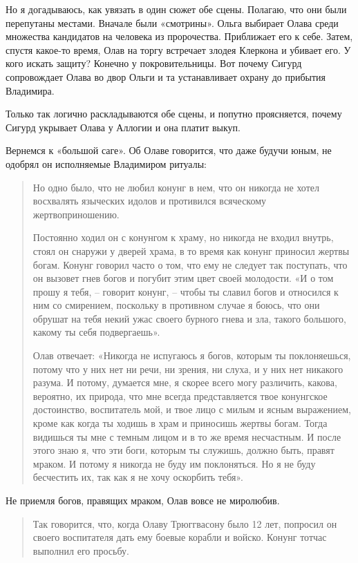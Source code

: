 Но я догадываюсь, как увязать в один сюжет обе сцены. Полагаю, что они были перепутаны местами. Вначале были «смотрины». Ольга выбирает Олава среди множества кандидатов на человека из пророчества. Приближает его к себе. Затем, спустя какое-то время, Олав на торгу встречает злодея Клеркона и убивает его. У кого искать защиту? Конечно у покровительницы. Вот почему Сигурд сопровождает Олава во двор Ольги и та устанавливает охрану до прибытия Владимира.

Только так логично раскладываются обе сцены, и попутно проясняется, почему Сигурд укрывает Олава у Аллогии и она платит выкуп. 

Вернемся к «большой саге». Об Олаве говорится, что даже будучи юным, не одобрял он исполняемые Владимиром ритуалы:

\begin{quotation}
Но одно было, что не любил конунг в нем, что он никогда не хотел восхвалять языческих идолов и противился всяческому жертвоприношению.

Постоянно ходил он с конунгом к храму, но никогда не входил внутрь, стоял он снаружи у дверей храма, в то время как конунг приносил жертвы богам. Конунг говорил часто о том, что ему не следует так поступать, что он вызовет гнев богов и погубит этим цвет своей молодости. «И о том прошу я тебя, – говорит конунг, – чтобы ты славил богов и относился к ним со смирением, поскольку в противном случае я боюсь, что они обрушат на тебя некий ужас своего бурного гнева и зла, такого большого, какому ты себя подвергаешь». 

Олав отвечает: «Никогда не испугаюсь я богов, которым ты поклоняешься, потому что у них нет ни речи, ни зрения, ни слуха, и у них нет никакого разума. И потому, думается мне, я скорее всего могу различить, какова, вероятно, их природа, что мне всегда представляется твое конунгское достоинство, воспитатель мой, и твое лицо с милым и ясным выражением, кроме как когда ты ходишь в храм и приносишь жертвы богам. Тогда видишься ты мне с темным лицом и в то же время несчастным. И после этого знаю я, что эти боги, которым ты служишь, должно быть, правят мраком. И потому я никогда не буду им поклоняться. Но я не буду бесчестить их, так как я не хочу оскорбить тебя».
\end{quotation}

Не приемля богов, правящих мраком, Олав вовсе не миролюбив.

\begin{quotation}
Так говорится, что, когда Олаву Трюггвасону было 12 лет, попросил он своего воспитателя дать ему боевые корабли и войско. Конунг тотчас выполнил его просьбу. 
\end{quotation}


